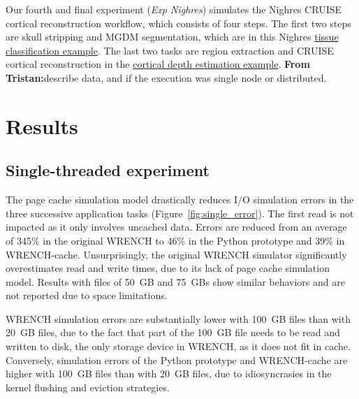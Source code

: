 \documentclass[conference]{IEEEtran}
\newcommand{\tristan}[1]{\color{orange}\textbf{From Tristan:}#1\color{black}}
\newcommand{\wrench}{WRENCH\xspace}
\begin{document}
            Our fourth and final experiment (\textit{Exp Nighres})
            simulates the Nighres CRUISE cortical reconstruction workflow, which consists 
            of four steps. The first two steps are skull stripping and MGDM segmentation, 
            which are in this Nighres \href{{https://nighres.readthedocs.io/en/latest/auto_examples/example_01_tissue_classification.html}}{tissue classification example}. 
            The last two tasks are region extraction and CRUISE cortical reconstruction 
            in the   
            \href{https://nighres.readthedocs.io/en/latest/auto_examples/example_02_cortical_depth_estimation.html}{cortical depth estimation example}.
            \tristan{describe data, and if the execution was single node or
            distributed.}

    \section{Results}
    \label{results}

        \subsection{Single-threaded experiment}

        The page cache simulation model drastically reduces I/O simulation
        errors in the three successive application tasks (Figure~\ref{fig:single_error}). The first read is not impacted
        as it only involves uncached data. Errors are reduced from an average
        of 345\% in the original \wrench to 46\% in the Python prototype and
        39\% in \wrench-cache. Unsurprisingly, the original \wrench simulator
        significantly overestimates read and write times, due to its lack
        of page cache simulation model. Results with files of 50~GB and 75~GBs
        show similar behaviors and are not reported due to space limitations.

        \wrench simulation errors are substantially lower with 100~GB
        files than with 20~GB files, due to the fact that part of the
        100~GB file needs to be read and written to disk, the only storage
        device in \wrench, as it does not fit in cache. Conversely,
        simulation errors of the Python prototype and \wrench-cache are higher with
        100~GB files than with 20~GB files, due to idiosyncrasies in the kernel
        flushing and eviction strategies.
\end{document}

